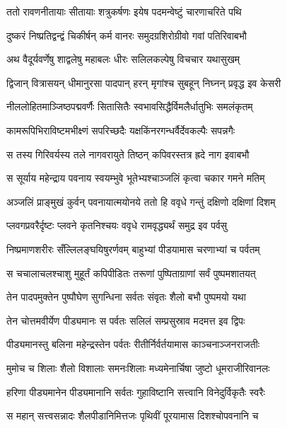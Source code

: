 
\twolineshloka
{ततो रावणनीतायाः सीतायाः शत्रुकर्षणः}
{इयेष पदमन्वेष्टुं चारणाचरिते पथि} %

\twolineshloka
{दुष्करं निष्प्रतिद्वन्द्वं चिकीर्षन् कर्म वानरः}
{समुदग्रशिरोग्रीवो गवां पतिरिवाबभौ} %

\twolineshloka
{अथ वैदूर्यवर्णेषु शाद्वलेषु महाबलः}
{धीरः सलिलकल्पेषु विचचार यथासुखम्} %

\twolineshloka
{द्विजान् वित्रासयन् धीमानुरसा पादपान् हरन्}
{मृगांश्च सुबहून् निघ्नन् प्रवृद्ध इव केसरी} %

\twolineshloka
{नीललोहितमाञ्जिष्ठपद्मवर्णैः सितासितैः}
{स्वभावसिद्धैर्विमलैर्धातुभिः समलंकृतम्} %

\twolineshloka
{कामरूपिभिराविष्टमभीक्ष्णं सपरिच्छदैः}
{यक्षकिंनरगन्धर्वैर्देवकल्पैः सपन्नगैः} %

\twolineshloka
{स तस्य गिरिवर्यस्य तले नागवरायुते}
{तिष्ठन् कपिवरस्तत्र ह्रदे नाग इवाबभौ} %

\twolineshloka
{स सूर्याय महेन्द्राय पवनाय स्वयम्भुवे}
{भूतेभ्यश्चाञ्जलिं कृत्वा चकार गमने मतिम्} %

\twolineshloka
{अञ्जलिं प्राङ्मुखं कुर्वन् पवनायात्मयोनये}
{ततो हि ववृधे गन्तुं दक्षिणो दक्षिणां दिशम्} %

\twolineshloka
{प्लवगप्रवरैर्दृष्टः प्लवने कृतनिश्चयः}
{ववृधे रामवृद्ध्यर्थं समुद्र इव पर्वसु} %

\twolineshloka
{निष्प्रमाणशरीरः सँल्लिलङ्घयिषुरर्णवम्}
{बाहुभ्यां पीडयामास चरणाभ्यां च पर्वतम्} %

\twolineshloka
{स चचालाचलश्चाशु मुहूर्तं कपिपीडितः}
{तरूणां पुष्पिताग्राणां सर्वं पुष्पमशातयत्} %

\twolineshloka
{तेन पादपमुक्तेन पुष्पौघेण सुगन्धिना}
{सर्वतः संवृतः शैलो बभौ पुष्पमयो यथा} %

\twolineshloka
{तेन चोत्तमवीर्येण पीड्यमानः स पर्वतः}
{सलिलं सम्प्रसुस्राव मदमत्त इव द्विपः} %

\twolineshloka
{पीड्यमानस्तु बलिना महेन्द्रस्तेन पर्वतः}
{रीतीर्निर्वर्तयामास काञ्चनाञ्जनराजतीः} %

\twolineshloka
{मुमोच च शिलाः शैलो विशालाः समनःशिलाः}
{मध्यमेनार्चिषा जुष्टो धूमराजीरिवानलः} %

\twolineshloka
{हरिणा पीड्यमानेन पीड्यमानानि सर्वतः}
{गुहाविष्टानि सत्त्वानि विनेदुर्विकृतैः स्वरैः} %

\twolineshloka
{स महान् सत्त्वसन्नादः शैलपीडानिमित्तजः}
{पृथिवीं पूरयामास दिशश्चोपवनानि च} %


